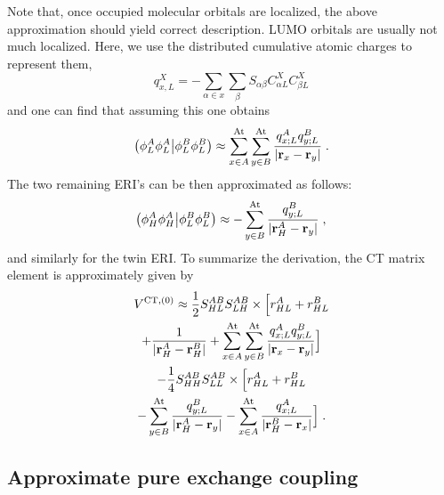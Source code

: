 %
Note that, once occupied molecular orbitals are localized, the above approximation
should yield correct description. LUMO orbitals are usually not much localized.
Here, we use the distributed cumulative atomic charges to represent them, %
%
\begin{equation} 
 q^X_{x,L} =-\sum_{\alpha\in x} \sum_\beta S_{\alpha\beta} C_{\alpha L}^X C_{\beta L}^X
\end{equation}
%
and one can find that assuming this one obtains
%
\begin{equation} 
 \bigl( {\phi_L^A \phi_L^A} \bigl\lvert {\phi_L^B \phi_L^B} \bigr) 
 \approx \sum_{x\in A}^{\rm At} \sum_{y\in B}^{\rm At}
 \frac{q_{x;L}^A q_{y;L}^B}{\vert {\bf r}_x - {\bf r}_y \vert} \;.
\end{equation}
%
The two remaining ERI's can be then approximated as follows:
%
\begin{equation} 
 \bigl( {\phi_H^A \phi_H^A} \bigl\lvert {\phi_L^B \phi_L^B} \bigr) 
 \approx -\sum_{y\in B}^{\rm At}
 \frac{q_{y;L}^B}{\vert {\bf r}_H^A - {\bf r}_y \vert} \;,
\end{equation}
%
and similarly for the twin ERI. To summarize the derivation, the CT matrix element
is approximately given by
%
\begin{multline}\label{e:v0-ct.mulliken.working}
 V^{{\rm CT },(0)} \approx \frac{1}{2} S_{HL}^{AB} S_{LH}^{AB} \times 
  \Big[ r_{HL}^A + r_{HL}^B \\ 
 + \frac{1}{\vert {\bf r}_H^A - {\bf r}_H^B \vert} 
 + \sum_{x\in A}^{\rm At} \sum_{y\in B}^{\rm At} 
 \frac{q_{x;L}^A q_{y;L}^B}{\vert {\bf r}_x - {\bf r}_y \vert} \Big] \\
 -\frac{1}{4} S_{HH}^{AB} S_{LL}^{AB} \times 
  \Big[ r_{HL}^A + r_{HL}^B \\
 -\sum_{y\in B}^{\rm At}
 \frac{q_{y;L}^B}{\vert {\bf r}_H^A - {\bf r}_y \vert} 
 -\sum_{x\in A}^{\rm At}
 \frac{q_{x;L}^A}{\vert {\bf r}_H^B - {\bf r}_x \vert} \Big]\;.
\end{multline}
%


\subsection{\label{s:2.3}Approximate pure exchange coupling}

